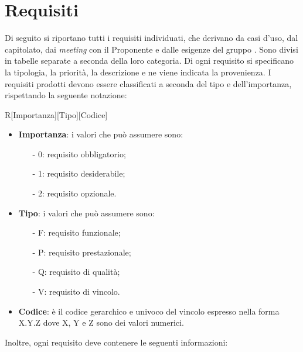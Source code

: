 \section{Requisiti}
Di seguito si riportano tutti i requisiti individuati, che derivano da casi d’uso, dal capitolato, dai \textit{meeting} con il Proponente e dalle esigenze del gruppo \GRUPPO. Sono divisi in tabelle separate a seconda della loro categoria. Di ogni requisito si specificano la tipologia, la priorità, la descrizione e ne viene indicata la provenienza.
I requisiti prodotti devono essere classificati a seconda del tipo e dell'importanza, rispettando la seguente notazione:

\begin{center}
	R[Importanza][Tipo][Codice]
\end{center}

\begin{itemize}
	\item\textbf{Importanza}: i valori che può assumere sono:
	
	\begin{itemize}
		\item[-] 0: requisito obbligatorio;
		\item[-] 1: requisito desiderabile;
		\item[-] 2: requisito opzionale.
	\end{itemize}
	
	\item\textbf{Tipo}: i valori che può assumere sono:
		\begin{itemize}
			\item[-] F: requisito funzionale;
			\item[-] P: requisito prestazionale;
			\item[-] Q: requisito di qualità;
			\item[-] V: requisito di vincolo.
		\end{itemize}
	
	\item\textbf{Codice}: è il codice gerarchico e univoco del vincolo espresso nella forma X.Y.Z dove X, Y e Z sono dei valori numerici.
\end{itemize}
Inoltre, ogni requisito deve contenere le seguenti informazioni:
	
